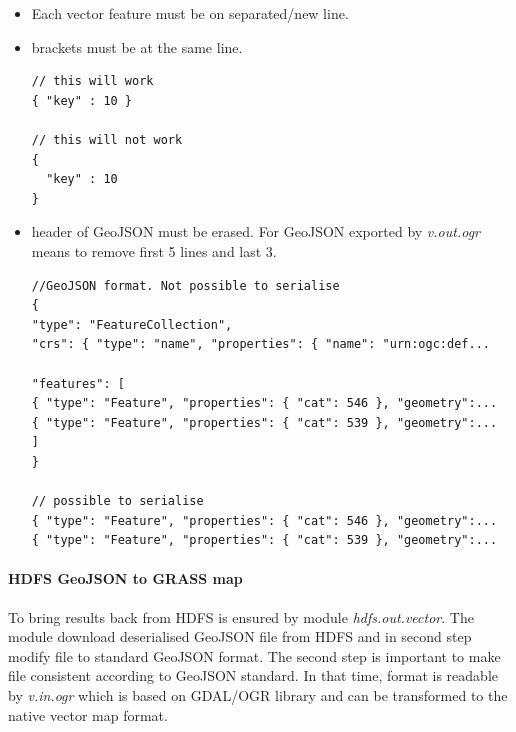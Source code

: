 \documentclass[a4paper,12pt,oneside]{report}
\begin{document}
\begin{itemize}
\item Each vector feature must be on separated/new line.
\item brackets must be at the same line.
\begin{footnotesize}
\begin{lstlisting}[style=python]
// this will work
{ "key" : 10 }

// this will not work
{
  "key" : 10 
}
\end{lstlisting}
\end{footnotesize}

\item header of GeoJSON must be erased. For GeoJSON exported by \textit{v.out.ogr} means to remove first 5 lines and last 3.
\begin{footnotesize}
\begin{lstlisting}[style=python]
//GeoJSON format. Not possible to serialise
{
"type": "FeatureCollection",
"crs": { "type": "name", "properties": { "name": "urn:ogc:def...
                                                                                
"features": [
{ "type": "Feature", "properties": { "cat": 546 }, "geometry":...
{ "type": "Feature", "properties": { "cat": 539 }, "geometry":...
]
}

// possible to serialise
{ "type": "Feature", "properties": { "cat": 546 }, "geometry":...
{ "type": "Feature", "properties": { "cat": 539 }, "geometry":...
\end{lstlisting}
\end{footnotesize}
\end{itemize}



\paragraph{HDFS GeoJSON to GRASS map}
To bring results back from HDFS is ensured by module \textit{hdfs.out.vector}. The module download deserialised GeoJSON file from HDFS and in second step modify file to standard GeoJSON format. The second step is important to make file consistent according to GeoJSON standard. In that time, format is readable by \textit{v.in.ogr} which is based on GDAL/OGR library and can be transformed to the native vector map format.
\end{document}

